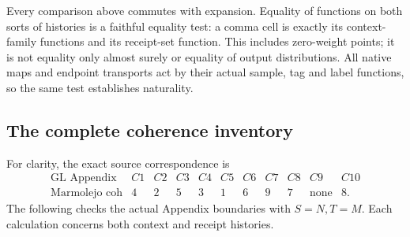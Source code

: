 \documentclass[11pt,a4paper]{article}
\theoremstyle{definition}
\begin{document}
Every comparison above commutes with expansion. Equality of functions on
both sorts of histories is a faithful equality test: a comma cell is exactly
its context-family functions and its receipt-set function. This includes
zero-weight points; it is not equality only almost surely or equality of
output distributions. All native maps and endpoint transports act by their
actual sample, tag and label functions, so the same test establishes
naturality.

\subsection{The complete coherence inventory}

For clarity, the exact source correspondence is
\[
\begin{array}{c|cccccccccc}
\text{GL Appendix}&C1&C2&C3&C4&C5&C6&C7&C8&C9&C10\\\hline
\text{Marmolejo coh}&4&2&5&3&1&6&9&7&\text{none}&8.
\end{array}
\]
The following checks the actual Appendix boundaries with $S=N,T=M$.
Each calculation concerns both context and receipt histories.
\end{document}

